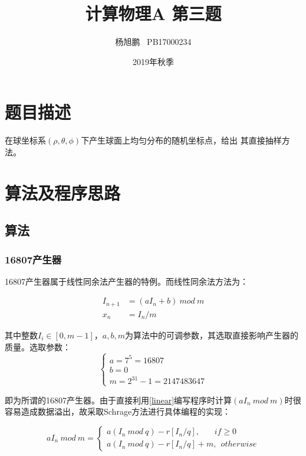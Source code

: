 \documentclass[a4paper,11pt]{article}
\author{ 杨旭鹏  \  PB17000234}
\date{2019年秋季}
\title{计算物理A 第三题}
\begin{document}
\maketitle

\section{题目描述}
在球坐标系$(\rho,\theta,\phi)$下产生球面上均匀分布的随机坐标点，给出 其直接抽样方法。

\section{算法及程序思路}
\subsection{算法}
\subsubsection{16807产生器}
16807产生器属于线性同余法产生器的特例。而线性同余法方法为：

\begin{equation}
\begin{aligned}
	I_{n+1} &= (aI_{n} + b) \ mod \ m \\
	x_{n} &= I_{n}/m
\end{aligned}
\label{linear}	
\end{equation}

其中整数$I_{i} \in [0,m-1]$，$a,b,m$为算法中的可调参数，其选取直接影响产生器的质量。选取参数：
\begin{equation}
\left\{
\begin{array}{l}
	a = 7^{5} = 16807 \\
	b = 0 \\
	m = 2^{31}-1 = 2147483647
\end{array}
\right.
\end{equation}

即为所谓的16807产生器。由于直接利用\ref{linear}编写程序时计算$(aI_{n} \ mod \ m )$时很容易造成数据溢出，故采取Schrage方法进行具体编程的实现：

\begin{equation}
	aI_{n} \ mod \ m = \left\{
	\begin{array}{l}
		a(I_{n}\ mod \ q) - r[I_{n}/q],\ \ \ \ \ \ \ \ if \geq 0 \\
		a(I_{n}\ mod \ q) - r[I_{n}/q] + m,\ \ otherwise	
			\end{array}
	\right.
\end{equation}
\end{document}
